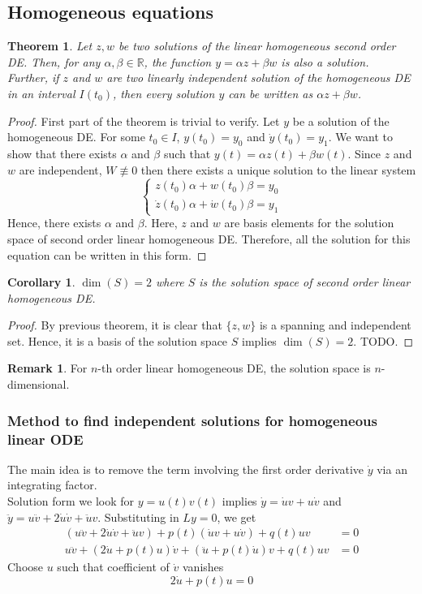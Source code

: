 \documentclass[12pt,reqno]{amsart}
\theoremstyle{plain}
\newtheorem{thm}{Theorem}
\newtheorem{cor}{Corollary}
\theoremstyle{definition}
\newtheorem{rem}{Remark}
\newcommand{\bb}[1]{\mathbb{#1}}
\begin{document}
\subsection{Homogeneous equations}
\begin{thm}
    Let $z,w$ be two solutions of the linear homogeneous second order DE. Then, for any $\alpha, \beta \in \bb{R}$, the function $y = \alpha z + \beta w$ is also a solution.\\ Further, if $z$ and $w$ are two linearly independent solution of the homogeneous DE in an interval $I(t_0)$, then every solution $y$ can be written as $\alpha z + \beta w$.
\end{thm}
\begin{proof}
    First part of the theorem is trivial to verify. Let $y$ be a solution of the homogeneous DE. For some $t_0 \in I$, $y(t_0) = y_0 $ and $\dot{y}(t_0) = y_1$. We want to show that there exists $\alpha$ and $\beta$ such that $y(t) = \alpha z(t) + \beta w (t)$. Since $z$ and $w$ are independent, $W \not\equiv 0$ then there exists a unique solution to the linear system
    $$ \left\{
    \begin{array}{l}
        z(t_0)\alpha + w(t_0)\beta = y_0 \\
        \dot{z}(t_0) \alpha + \dot{w}(t_0) \beta = y_1
    \end{array}
    \right.
    $$
    Hence, there exists $\alpha $ and $\beta$. Here, $z$ and $w$ are basis elements for the solution space of second order linear homogeneous DE. Therefore, all the solution for this equation can be written in this form.
\end{proof}
\begin{cor}
    $\dim(S) = 2$ where $S$ is the solution space of second order linear homogeneous DE.
\end{cor}
\begin{proof}
    By previous theorem, it is clear that $\{z,w\}$ is a spanning and independent set. Hence, it is a basis of the solution space $S$ implies $\dim(S) = 2$. TODO.
\end{proof}
\begin{rem}
    For $n$-th order linear homogeneous DE, the solution space is $n$-dimensional.
\end{rem}
\subsubsection{\bf Method to find independent solutions for homogeneous linear ODE} The main idea is to remove the term involving the first order derivative $\dot{y}$ via an integrating factor.\\
Solution form we look for $y = u(t)v(t)$ implies $\dot{y} = \dot{u}v + u\dot{v}$ and $\ddot{y} = u\ddot{v} + 2\dot{u}\dot{v} + \ddot{u}v$. Substituting in $Ly = 0$, we get
\begin{align*}
    (u\ddot{v} + 2\dot{u}\dot{v} + \ddot{u}v) + p(t)(\dot{u}v + u\dot{v}) + q(t)uv &= 0\\
    u\ddot{v} + (2\dot{u} + p(t)u)\dot{v} + (\ddot{u} + p(t)\dot{u})v + q(t)uv &= 0
\end{align*}
Choose $u$ such that coefficient of $\dot{v}$ vanishes
$$ 2\dot{u} + p(t)u = 0$$
\end{document}
